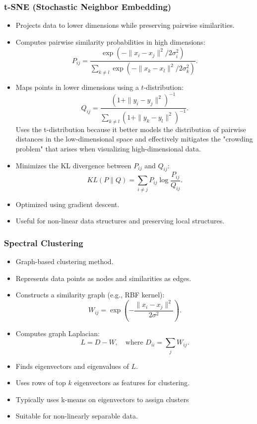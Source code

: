 \documentclass[12pt,a4paper]{article}
\begin{document}
\subsubsection{t-SNE (Stochastic Neighbor Embedding)}
\begin{itemize}
    \item Projects data to lower dimensions while preserving pairwise similarities.
    \item Computes pairwise similarity probabilities in high dimensions:
    \[ P_{ij} = \frac{\exp(-\|x_i - x_j\|^2 / 2\sigma_i^2)}{\sum_{k \neq l} \exp(-\|x_k - x_l\|^2 / 2\sigma_k^2)}. \]
    \item Maps points in lower dimensions using a $t$-distribution:
    \[ Q_{ij} = \frac{(1 + \|y_i - y_j\|^2)^{-1}}{\sum_{k \neq l} (1 + \|y_k - y_l\|^2)^{-1}}. \]
    Uses the t-distribution because it better models the distribution of pairwise distances in the low-dimensional space and effectively mitigates the "crowding problem" that arises when visualizing high-dimensional data.
    \item Minimizes the KL divergence between $P_{ij}$ and $Q_{ij}$:
    \[ KL(P \| Q) = \sum_{i \neq j} P_{ij} \log \frac{P_{ij}}{Q_{ij}}. \]
    \item Optimized using gradient descent.
    \item Useful for non-linear data structures and preserving local structures.
\end{itemize}

\subsubsection{Spectral Clustering}
\begin{itemize}
    \item Graph-based clustering method.
    \item Represents data points as nodes and similarities as edges.
    \item Constructs a similarity graph (e.g., RBF kernel):
    \[ W_{ij} = \exp\left(-\frac{\|x_i - x_j\|^2}{2\sigma^2}\right). \]
    \item Computes graph Laplacian:
    \[ L = D - W, \quad \text{where } D_{ii} = \sum_j W_{ij}. \]
    \item Finds eigenvectors and eigenvalues of $L$.
    \item Uses rows of top $k$ eigenvectors as features for clustering.
    \item Typically uses k-means on eigenvectors to assign clusters
    \item Suitable for non-linearly separable data.
\end{itemize}
\end{document}
